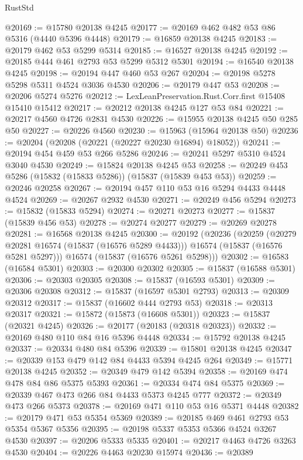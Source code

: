 \begin{lexlean}{RustStd}
\begin{coremodule}
{\begin{coremodule}
{{{{{{{{{{{{{{{{{{{{{{{{{{{{{{{{{{{{{{{{{{{{{{{{{{{{{{{{{{{{@20169 := @15780 @20138 @4245
@20177 := @20169 @462 @482 @53 @86 @5316 (@4440 @5396 @4448)
@20179 := @16859 @20138 @4245
@20183 := @20179 @462 @53 @5299 @5314
@20185 := @16527 @20138 @4245
@20192 := @20185 @444 @461 @2793 @53 @5299 @5312 @5301
@20194 := @16540 @20138 @4245
@20198 := @20194 @447 @460 @53 @267
@20204 := @20198 @5278 @5298 @5311 @4524 @3036 @4530
@20206 := @20179 @447 @53
@20208 := @20206 @5274 @5276
@20212 := LexLeanPreservation.Rust.Corr.first @15408 @15410 @15412
@20217 := @20212 @20138 @4245 @127 @53 @84
@20221 := @20217 @4560 @4726 @2831 @4530
@20226 := @15955 @20138 @4245 @50 @285 @50
@20227 := @20226 @4560
@20230 := @15963 (@15964 @20138 @50)
@20236 := @20204 (@20208 (@20221 (@20227 @20230 @16894) @18052))
@20241 := @20194 @454 @459 @53 @266 @5286
@20246 := @20241 @5297 @5310 @4524 @3040 @4530
@20249 := @15824 @20138 @4245 @53
@20258 := @20249 @453 @5286 (@15832 (@15833 @5286)) (@15837 (@15839 @453 @53))
@20259 := @20246 @20258
@20267 := @20194 @457 @110 @53 @16 @5294 @4433 @4448 @4524
@20269 := @20267 @2932 @4530
@20271 := @20249 @456 @5294
@20273 := @15832 (@15833 @5294)
@20274 := @20271 @20273
@20277 := @15837 (@15839 @456 @53)
@20278 := @20274 @20277
@20279 := @20269 @20278
@20281 := @16568 @20138 @4245
@20300 := @20192
    (@20236
      (@20259
        (@20279 @20281 @16574 (@15837 (@16576 @5289 @4433)))
        @16574
        (@15837 (@16576 @5281 @5297)))
      @16574
      (@15837 (@16576 @5261 @5298)))
@20302 := @16583 (@16584 @5301)
@20303 := @20300 @20302
@20305 := @15837 (@16588 @5301)
@20306 := @20303 @20305
@20308 := @15837 (@16593 @5301)
@20309 := @20306 @20308
@20312 := @15837 (@16597 @5301 @2793)
@20313 := @20309 @20312
@20317 := @15837 (@16602 @444 @2793 @53)
@20318 := @20313 @20317
@20321 := @15872 (@15873 (@16608 @5301))
@20323 := @15837 (@20321 @4245)
@20326 := @20177 (@20183 (@20318 @20323))
@20332 := @20169 @480 @110 @84 @16 @5396 @4448
@20334 := @15792 @20138 @4245
@20337 := @20334 @480 @84 @5396
@20339 := @15801 @20138 @4245
@20347 := @20339 @153 @479 @142 @84 @4433 @5394 @4245 @264
@20349 := @15771 @20138 @4245
@20352 := @20349 @479 @142 @5394
@20358 := @20169 @474 @478 @84 @86 @5375 @5393
@20361 := @20334 @474 @84 @5375
@20369 := @20339 @467 @473 @266 @84 @4433 @5373 @4245 @777
@20372 := @20349 @473 @266 @5373
@20378 := @20169 @471 @110 @53 @16 @5371 @4448
@20382 := @20179 @471 @53 @5354 @5369
@20389 := @20185 @469 @461 @2793 @53 @5354 @5367 @5356
@20395 := @20198 @5337 @5353 @5366 @4524 @3267 @4530
@20397 := @20206 @5333 @5335
@20401 := @20217 @4463 @4726 @3263 @4530
@20404 := @20226 @4463 @20230 @15974
@20436 := @20389
}}}}}}}}}}}}}}}}}}}}}}}}}}}}}}}}}}}}}}}}}}}}}}}}}}}}}}}}}}}}
\end{coremodule}}
\end{coremodule}
\end{lexlean}
